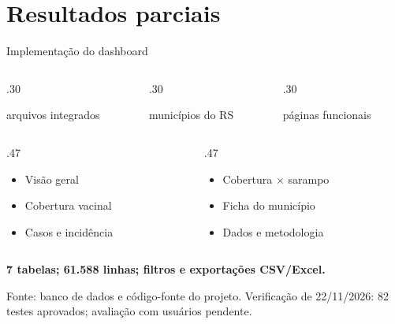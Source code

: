 \documentclass[aspectratio=169]{beamer}
\newcommand{\fonte}[1]{\vfill{\tiny\color{InfGray}#1\par}}
\newcommand{\destaque}[1]{{\color{InfRed}\bfseries #1}}
\begin{document}
\section{Resultados parciais}
\begin{frame}[t]{Implementação do dashboard}
\vspace{4mm}
\begin{columns}[T,onlytextwidth]
\begin{column}{.30\textwidth}\centering{\fontsize{29}{33}\selectfont\destaque{70}}\par arquivos integrados\end{column}
\begin{column}{.30\textwidth}\centering{\fontsize{29}{33}\selectfont\destaque{497}}\par municípios do RS\end{column}
\begin{column}{.30\textwidth}\centering{\fontsize{29}{33}\selectfont\destaque{6}}\par páginas funcionais\end{column}
\end{columns}
\vspace{4mm}
\begin{columns}[T,onlytextwidth]
\begin{column}{.47\textwidth}\begin{itemize}\setlength{\itemsep}{1mm}\item Visão geral\item Cobertura vacinal\item Casos e incidência\end{itemize}\end{column}
\begin{column}{.47\textwidth}\begin{itemize}\setlength{\itemsep}{1mm}\item Cobertura $\times$ sarampo\item Ficha do município\item Dados e metodologia\end{itemize}\end{column}
\end{columns}
\vspace{3mm}\textbf{7 tabelas; 61.588 linhas; filtros e exportações CSV/Excel.}
\fonte{Fonte: banco de dados e código-fonte do projeto. Verificação de 22/11/2026: 82 testes aprovados; avaliação com usuários pendente.}
\end{frame}
\end{document}
